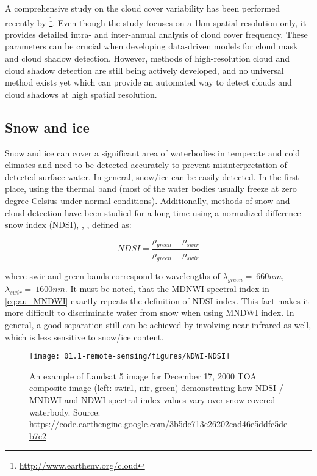 A comprehensive study on the cloud cover variability has been performed recently by \citep{wilson2016remotely}\footnote{\url{http://www.earthenv.org/cloud}}. Even though the study focuses on a 1km spatial resolution only, it provides detailed intra- and inter-annual analysis of cloud cover frequency. These parameters can be crucial when developing data-driven models for cloud mask and cloud shadow detection. However, methods of high-resolution cloud and cloud shadow detection are still being actively developed, and no universal method exists yet which can provide an automated way to detect clouds and cloud shadows at high spatial resolution. 

\subsection{Snow and ice}

Snow and ice can cover a significant area of waterbodies in temperate and cold climates and need to be detected accurately to prevent misinterpretation of detected surface water. In general, snow/ice can be easily detected. In the first place, using the thermal band (most of the water bodies usually freeze at zero degree Celsius under normal conditions).  Additionally, methods of snow and cloud detection have been studied for a long time using a normalized difference snow index (NDSI), \citep{valovcin1976snow}, \citep{hall1995development}, defined as:

\begin{equation}
NDSI=\frac{\rho_{green}-\rho_{swir}}{\rho_{green}+\rho_{swir}}
\end{equation}

where swir and green bands correspond to wavelengths of $\lambda_{green}=~660nm$, $\lambda_{swir}=~1600nm$. It must be noted, that the MDNWI spectral index in \ref{eq:au_MNDWI} exactly repeats the definition of NDSI index. This fact makes it more difficult to discriminate water from snow when using MNDWI index. In general, a good separation still can be achieved by involving near-infrared as well, which is less sensitive to snow/ice content.

\begin{figure}[H]
	\texttt{[image: 01.1-remote-sensing/figures/NDWI-NDSI]}
	\caption{An example of Landsat 5 image for December 17, 2000 TOA composite image (left: swir1, nir, green) demonstrating how NDSI / MNDWI and NDWI spectral index values vary over snow-covered waterbody. Source: \url{https://code.earthengine.google.com/3b5de713c26202cad46e5ddfc5deb7c2}}
	\label{fig:snow}
\end{figure}


